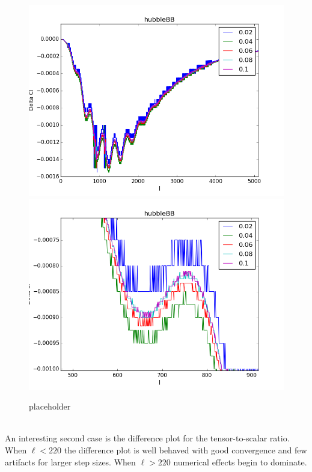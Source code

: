 \begin{figure}
\centering
\includegraphics[scale=0.6]{images/diffs/H0bb.png}
\includegraphics[scale=0.6]{images/diffs/H0bbz.png}
\caption{placeholder}
\end{figure}
\\
An interesting second case is the difference plot for the tensor-to-scalar ratio. When $\ell < 220$ the difference plot is well behaved with good convergence and few artifacts for larger step sizes. When $\ell > 220$ numerical effects begin to dominate.


